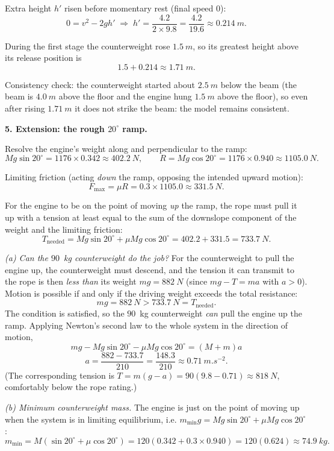 \documentclass[11pt]{article}
\begin{document}
Extra height $h'$ risen before momentary rest (final speed $0$):
\[ 0 = v^2 - 2gh' \;\Longrightarrow\; h' = \frac{4.2}{2 \times 9.8} = \frac{4.2}{19.6} \approx \SI{0.214}{m}. \]

During the first stage the counterweight rose $\SI{1.5}{m}$, so its greatest height above its release position is
\[ 1.5 + 0.214 \approx \SI{1.71}{m}. \]

Consistency check: the counterweight started about $\SI{2.5}{m}$ below the beam (the beam is $\SI{4.0}{m}$ above the floor and the engine hung $\SI{1.5}{m}$ above the floor), so even after rising $\SI{1.71}{m}$ it does not strike the beam: the model remains consistent.

\textbf{5. Extension: the rough $20^\circ$ ramp.}

Resolve the engine's weight along and perpendicular to the ramp:
\[ Mg\sin 20^\circ = 1176 \times 0.342 \approx \SI{402.2}{N}, \qquad R = Mg\cos 20^\circ = 1176 \times 0.940 \approx \SI{1105.0}{N}. \]

Limiting friction (acting \emph{down} the ramp, opposing the intended upward motion):
\[ F_{\max} = \mu R = 0.3 \times 1105.0 \approx \SI{331.5}{N}. \]

For the engine to be on the point of moving \emph{up} the ramp, the rope must pull it up with a tension at least equal to the sum of the downslope component of the weight and the limiting friction:
\[ T_{\text{needed}} = Mg\sin 20^\circ + \mu Mg\cos 20^\circ = 402.2 + 331.5 = \SI{733.7}{N}. \]

\emph{(a) Can the $90$~kg counterweight do the job?} For the counterweight to pull the engine up, the counterweight must descend, and the tension it can transmit to the rope is then \emph{less than} its weight $mg = \SI{882}{N}$ (since $mg - T = ma$ with $a > 0$). Motion is possible if and only if the driving weight exceeds the total resistance:
\[ mg = \SI{882}{N} > \SI{733.7}{N} = T_{\text{needed}}. \]
The condition is satisfied, so the $90$~kg counterweight \emph{can} pull the engine up the ramp. Applying Newton's second law to the whole system in the direction of motion,
\[ mg - Mg\sin 20^\circ - \mu Mg\cos 20^\circ = (M+m)a \]
\[ a = \frac{882 - 733.7}{210} = \frac{148.3}{210} \approx \SI{0.71}{m.s^{-2}}. \]
(The corresponding tension is $T = m(g - a) = 90(9.8 - 0.71) \approx \SI{818}{N}$, comfortably below the rope rating.)

\emph{(b) Minimum counterweight mass.} The engine is just on the point of moving up when the system is in limiting equilibrium, i.e. $m_{\min} g = Mg\sin 20^\circ + \mu Mg\cos 20^\circ$:
\[ m_{\min} = M(\sin 20^\circ + \mu\cos 20^\circ) = 120(0.342 + 0.3 \times 0.940) = 120(0.624) \approx \SI{74.9}{kg}. \]
\end{document}

